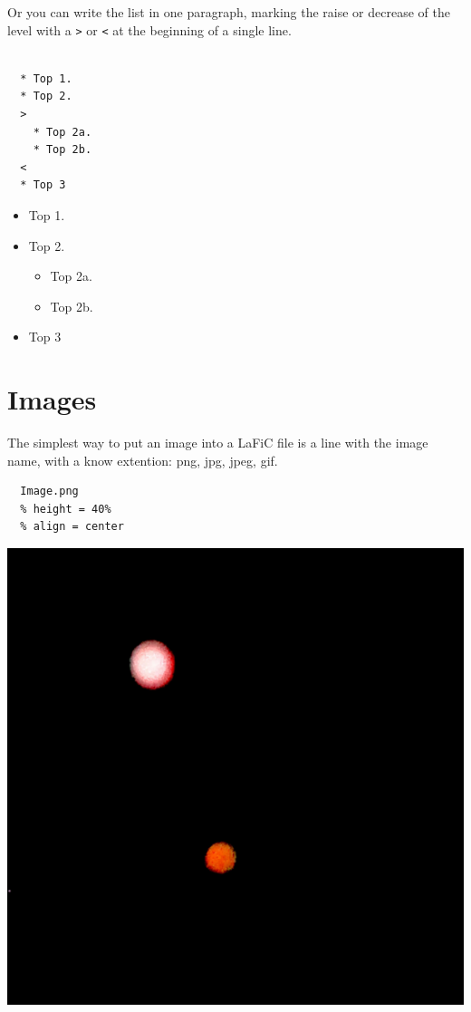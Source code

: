 \documentclass{article}
\begin{document}
{Or you can write the list in one paragraph, marking the
raise or decrease of the level with a \texttt{>} or \texttt{<} at the
beginning of a single line.\\}

\begin{verbatim}

  * Top 1.
  * Top 2.
  >
    * Top 2a.
    * Top 2b.
  <
  * Top 3
\end{verbatim}


\begin{itemize}
\item Top 1.
\item Top 2.
\begin{itemize}
\item Top 2a.
\item Top 2b.
\end{itemize}
\item Top 3
\end{itemize}


\section{Images}

{The simplest way to put an image into a LaFiC file is a
line with the image name, with a know extention: png, jpg,
jpeg, gif.\\}

\begin{verbatim}
  Image.png
  % height = 40%
  % align = center
\end{verbatim}


{\centering\includegraphics[height=.40\textheight]{Image.png}\\}
\end{document}
